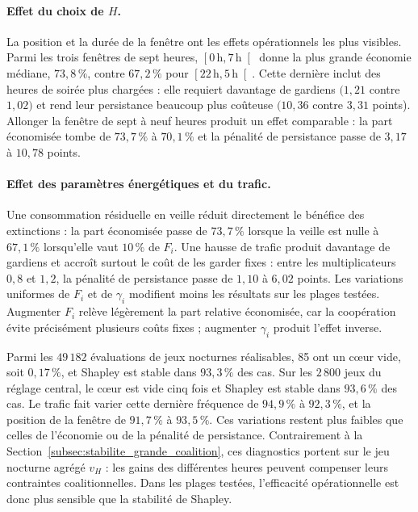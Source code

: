 \paragraph{Effet du choix de \(H\).}
La position et la durée de la fenêtre ont les effets opérationnels les plus
visibles. Parmi les trois fenêtres de sept heures,
\(\left[0\,\mathrm h,7\,\mathrm h\right[\) donne la plus grande économie
médiane, \(73{,}8\,\%\), contre \(67{,}2\,\%\) pour
\(\left[22\,\mathrm h,5\,\mathrm h\right[\). Cette dernière inclut
des heures de soirée plus chargées : elle requiert davantage de gardiens
\((1{,}21\) contre \(1{,}02)\) et rend leur persistance beaucoup plus coûteuse
\((10{,}36\) contre \(3{,}31\) points). Allonger la fenêtre de sept à neuf
heures produit un effet comparable : la part économisée tombe de
\(73{,}7\,\%\) à \(70{,}1\,\%\) et la pénalité de persistance passe de
\(3{,}17\) à \(10{,}78\) points.

\paragraph{Effet des paramètres énergétiques et du trafic.}
Une consommation résiduelle en veille réduit directement le bénéfice des
extinctions : la part économisée passe de \(73{,}7\,\%\) lorsque la veille est
nulle à \(67{,}1\,\%\) lorsqu'elle vaut \(10\,\%\) de \(F_i\). Une hausse de
trafic produit davantage de gardiens et accroît surtout le coût de les garder
fixes : entre les multiplicateurs \(0{,}8\) et \(1{,}2\), la pénalité de
persistance passe de \(1{,}10\) à \(6{,}02\) points. Les variations uniformes
de \(F_i\) et de \(\gamma_i\) modifient moins les résultats sur les plages
testées. Augmenter \(F_i\) relève légèrement la part relative économisée,
car la coopération évite précisément plusieurs coûts fixes ; augmenter
\(\gamma_i\) produit l'effet inverse.

Parmi les \(49\,182\) évaluations de jeux nocturnes réalisables, 85 ont un cœur
vide, soit \(0{,}17\,\%\), et Shapley est stable dans \(93{,}3\,\%\) des cas.
Sur les \(2\,800\) jeux du réglage central, le cœur est vide cinq fois et
Shapley est stable dans \(93{,}6\,\%\) des cas. Le trafic fait varier cette
dernière fréquence de \(94{,}9\,\%\) à \(92{,}3\,\%\), et la position de la
fenêtre de \(91{,}7\,\%\) à \(93{,}5\,\%\). Ces variations restent plus faibles que celles de l'économie ou de
la pénalité de persistance. Contrairement à la
Section~\ref{subsec:stabilite_grande_coalition}, ces diagnostics portent sur
le jeu nocturne agrégé \(v_H\) : les gains des différentes heures peuvent
compenser leurs contraintes coalitionnelles. Dans les plages testées,
l'efficacité opérationnelle est donc plus sensible que la stabilité de
Shapley.

